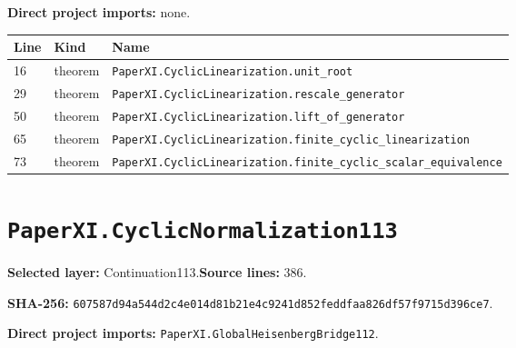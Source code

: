 \documentclass[10pt,oneside]{book}
\begin{document}

\textbf{Direct project imports:} none.

\begin{longtable}{@{}p{}p{}p{}@{}}\toprule Line&Kind&Name\\\midrule\endhead

16&theorem&\nolinkurl{PaperXI.CyclicLinearization.unit_root}\\

29&theorem&\nolinkurl{PaperXI.CyclicLinearization.rescale_generator}\\

50&theorem&\nolinkurl{PaperXI.CyclicLinearization.lift_of_generator}\\

65&theorem&\nolinkurl{PaperXI.CyclicLinearization.finite_cyclic_linearization}\\

73&theorem&\nolinkurl{PaperXI.CyclicLinearization.finite_cyclic_scalar_equivalence}\\

\bottomrule\end{longtable}

\section{\texorpdfstring{\nolinkurl{PaperXI.CyclicNormalization113}}{PaperXI.CyclicNormalization113}}\label{module:PaperXI.CyclicNormalization113}

\textbf{Selected layer:} Continuation113.\quad\textbf{Source lines:} 386.\par\textbf{SHA-256:} {\scriptsize\nolinkurl{607587d94a544d2c4e014d81b21e4c9241d852feddfaa826df57f9715d396ce7}}.


\textbf{Direct project imports:} \nolinkurl{PaperXI.GlobalHeisenbergBridge112}.
\end{document}

